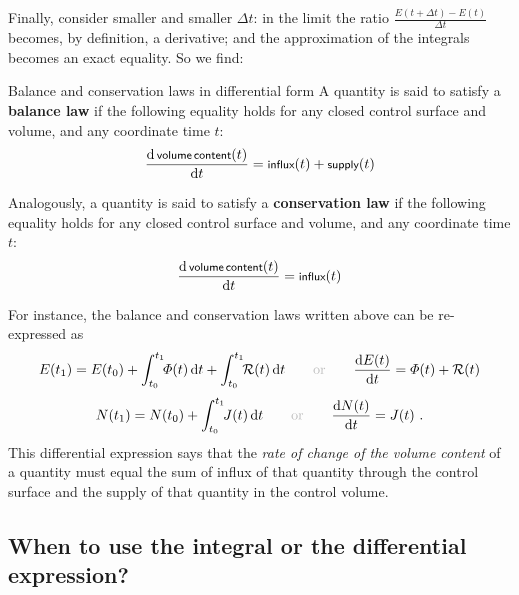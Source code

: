 \documentclass[a4paper,12pt,%
onecolumn,oneside,%
british%
]{memoir}
\newcommand*{\di}{\mathop{}\!\mathrm{d}}%
\newcommand*{\incr}{\Delta}%
\renewcommand*{\|}[1][]{\nonscript\:#1\vert\nonscript\:\mathopen{}}
\newcommand*{\yti}{t_{0}}
\newcommand*{\ytf}{t_{1}}
\newcommand*{\dt}{\di t}
\newcommand*{\Dt}{\incr t}
\newcommand*{\yN}{N}
\newcommand*{\yJ}{J}
\newcommand*{\yE}{E}
\newcommand*{\yH}{\varPhi}%
\newcommand*{\yR}{\mathcal{R}}%
\begin{document}
Finally, consider smaller and smaller $\Dt$: in the limit the ratio \enskip$\frac{\yE(t+\Dt)-\yE(t)}{\Dt}$\enskip becomes, by definition, a derivative; and the approximation of the integrals becomes an exact equality. So we find:
\begin{definition}{Balance and conservation laws in differential form}
  A quantity is said to satisfy a \textbf{balance law} if the following equality holds for any closed control surface and volume, and any coordinate time $t$:
  \begin{equation}
    \label{eq:balanced_diff}
    \frac{\di\,\textsf{\footnotesize volume\,content}(t)}{\dt} =
    \textsf{\footnotesize influx}(t) +
    \textsf{\footnotesize supply}(t)
  \end{equation}

  \smallskip

  Analogously, a quantity is said to satisfy a \textbf{conservation law} if the following equality holds for any closed control surface and volume, and any coordinate time $t$:
  \begin{equation}
    \label{eq:conserved_diff}
    \frac{\di\,\textsf{\footnotesize volume\,content}(t)}{\dt} =
    \textsf{\footnotesize influx}(t)
  \end{equation}
\end{definition}
For instance, the balance and conservation laws written above can be re-expressed as
  \begin{equation*}
    \begin{gathered}
  \yE(\ytf) = \yE(\yti)
  + \int_{\yti}^{\ytf}\!\!\yH(t)\dt
  + \int_{\yti}^{\ytf}\!\!\yR(t)\dt
  \qquad\text{\color{grey}or}\qquad
      \frac{\di\yE(t)}{\dt} = \yH(t) + \yR(t)
      \\[\jot]
      \yN(\ytf) = \yN(\yti) + \int_{\yti}^{\ytf}\!\!\yJ(t)\dt
  \qquad\text{\color{grey}or}\qquad
    \frac{\di\yN(t)}{\dt} = \yJ(t) \ .
    \end{gathered}
  \end{equation*}
This differential expression says that the \emph{rate of change of the volume content} of a quantity must equal the sum of influx of that quantity through the control surface and the supply of that quantity in the control volume.

\subsection{When to use the integral or the differential expression?}
\label{sec:when_int_diff}
\end{document}
